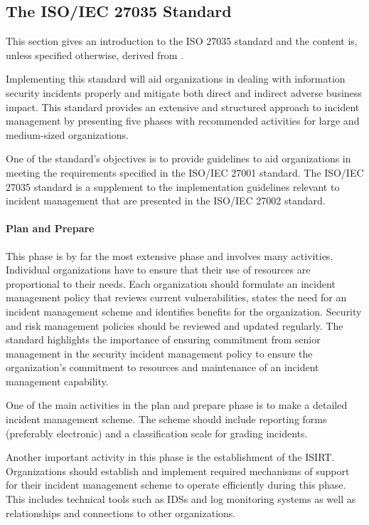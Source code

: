 \subsection{The \acs{ISO}/\acs{IEC} 27035 Standard}
\label{sec:iso27035}
This section gives an introduction to the ISO 27035 standard and the content is, unless specified otherwise, derived from \cite{ISO/IEC27035}. 

Implementing this standard will aid organizations in dealing with information security incidents properly and mitigate both direct and indirect adverse business impact. This standard provides an extensive and structured approach to incident management by presenting five phases with recommended activities for large and medium-sized organizations. 

One of the standard's objectives is to provide guidelines to aid organizations in meeting the requirements specified in the ISO/IEC 27001 standard. The ISO/IEC 27035 standard is a supplement to the implementation guidelines relevant to incident management that are presented in the ISO/IEC 27002 standard.

\paragraph{Plan and Prepare} This phase is by far the most extensive phase and involves many activities. Individual organizations have to ensure that their use of resources are proportional to their needs. Each organization should formulate an incident management policy that reviews current vulnerabilities, states the need for an incident management scheme and identifies benefits for the organization. Security and risk management policies should be reviewed and updated regularly. The standard highlights the importance of ensuring commitment from senior management in the security incident management policy to ensure the organization's commitment to resources and maintenance of an incident management capability.  

One of the main activities in the plan and prepare phase is to make a detailed incident management scheme. The scheme should include reporting forms (preferably electronic) and a classification scale for grading incidents.   

Another important activity in this phase is the establishment of the \acf{ISIRT}. Organizations should establish and implement required mechanisms of support for their incident management scheme to operate efficiently during this phase. This includes technical tools such as \acp{IDS} and log monitoring systems as well as relationships and connections to other organizations. 

